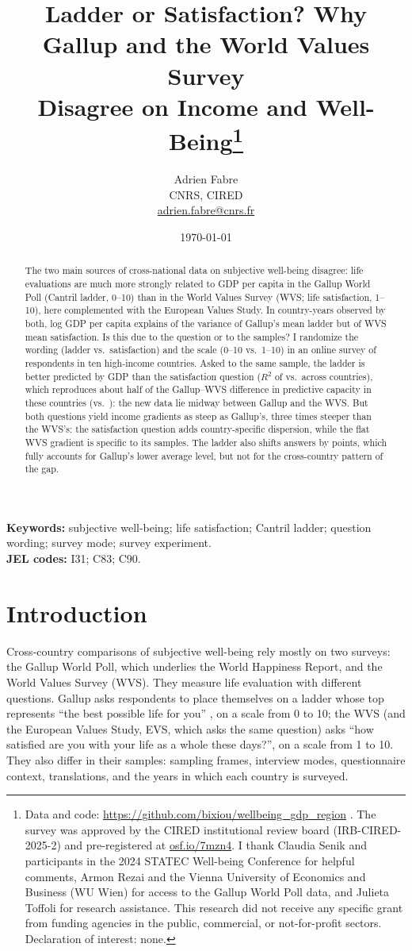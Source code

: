 \documentclass[12pt]{article}
\title{Ladder or Satisfaction? Why Gallup and the World Values Survey\\ Disagree on Income and Well-Being\thanks{Data and code: \url{https://github.com/bixiou/wellbeing_gdp_region} \todo{public repository (e.g.\ OSF); Gallup data cannot be redistributed}. The survey was approved by the CIRED institutional review board (IRB-CIRED-2025-2) and pre-registered at \href{https://osf.io/7mzn4}{osf.io/7mzn4}. I thank Claudia Senik and participants in the 2024 STATEC Well-being Conference for helpful comments, Armon Rezai and the Vienna University of Economics and Business (WU Wien) for access to the Gallup World Poll data, and Julieta Toffoli for research assistance. This research did not receive any specific grant from funding agencies in the public, commercial, or not-for-profit sectors. Declaration of interest: none.}}
\author{Adrien Fabre\\ \small CNRS, CIRED \todo{postal address}\\ \small \href{mailto:adrien.fabre@cnrs.fr}{adrien.fabre@cnrs.fr}}
\date{\today}
\begin{document}
\maketitle

\begin{abstract}
\noindent The two main sources of cross-national data on subjective well-being disagree: life evaluations are much more strongly related to GDP per capita in the Gallup World Poll (Cantril ladder, 0--10) than in the World Values Survey (WVS; life satisfaction, 1--10), here complemented with the European Values Study. In \nCommon country-years observed by both, log GDP per capita explains \RtwoCommonGallup of the variance of Gallup's mean ladder but \RtwoCommonWVS of WVS mean satisfaction. Is this due to the question or to the samples? I randomize the wording (ladder vs.\ satisfaction) and the scale (0--10 vs.\ 1--10) in an online survey of \nFabre respondents in ten high-income countries. Asked to the same sample, the ladder is better predicted by GDP than the satisfaction question ($R^2$ of \RtwoTenFabreLadderPooled vs.\ \RtwoTenFabreSatisfactionPooled across countries), which reproduces about half of the Gallup--WVS difference in predictive capacity in these countries (\RtwoTenGallup vs.\ \RtwoTenWVS): the new data lie midway between Gallup and the WVS. But both questions yield income gradients as steep as Gallup's, three times steeper than the WVS's: the satisfaction question adds country-specific dispersion, while the flat WVS gradient is specific to its samples. The ladder also shifts answers by \effectLadder points, which fully accounts for Gallup's lower average level, but not for the cross-country pattern of the gap.
\end{abstract}

\noindent\textbf{Keywords:} subjective well-being; life satisfaction; Cantril ladder; question wording; survey mode; survey experiment.\\
\noindent\textbf{JEL codes:} I31; C83; C90.

\section{Introduction}\label{sec:intro}

Cross-country comparisons of subjective well-being rely mostly on two surveys: the Gallup World Poll, which underlies the World Happiness Report, and the World Values Survey (WVS). They measure life evaluation with different questions. Gallup asks respondents to place themselves on a ladder whose top represents ``the best possible life for you'' \citep{cantril_pattern_1965}, on a scale from 0 to 10; the WVS (and the European Values Study, EVS, which asks the same question) asks ``how satisfied are you with your life as a whole these days?'', on a scale from 1 to 10. They also differ in their samples: sampling frames, interview modes, questionnaire context, translations, and the years in which each country is surveyed.
\end{document}
